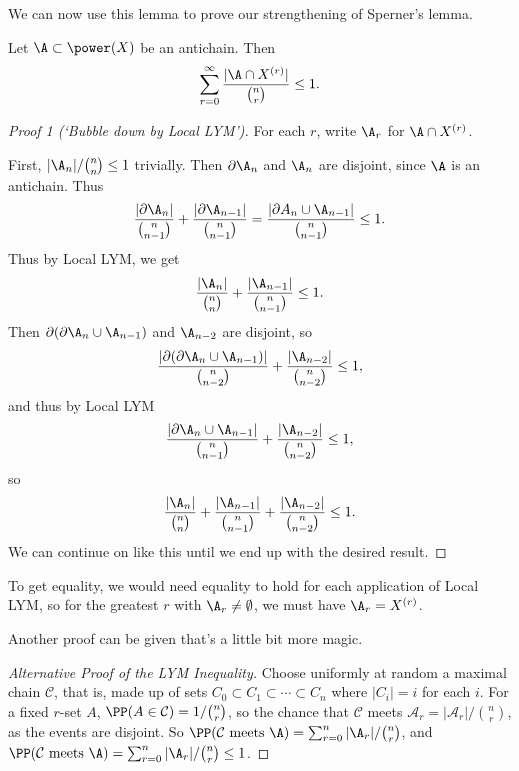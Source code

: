 We can now use this lemma to prove our strengthening of Sperner's lemma.

\begin{theorem}
    Let $\A \subset \power(X)$ be an antichain. Then
    $$
\sum_{r = 0}^{\infty} \frac{|\A \cap X^{(r)}|}{\binom{n}{r}} \leq 1.
    $$
\end{theorem}
\begin{proof}[Proof 1 (`Bubble down by Local LYM')]
    For each $r$, write $\A_r$ for $\A \cap X^{(r)}$.
    
    First, $|\A_n| / \binom{n}{n} \leq 1$ trivially. Then $\partial \A_n$ and $\A_n$ are disjoint, since $\A$ is an antichain. Thus
    $$
    \frac{|\partial \A_n|}{\binom{n}{n - 1}} + \frac{|\partial \A_{n - 1}|}{\binom{n}{n - 1}} = \frac{|\partial A_n \cup \A_{n - 1}|}{\binom{n}{n - 1}} \leq 1.
    $$
    Thus by Local LYM, we get
    $$
    \frac{|\A_n|}{\binom{n}{n}} + \frac{|\A_{n - 1}|}{\binom{n}{n - 1}} \leq 1.
    $$
    Then $\partial(\partial \A_n \cup \A_{n - 1})$ and $\A_{n - 2}$ are disjoint, so
    $$
\frac{|\partial(\partial \A_n \cup \A_{n - 1})|}{\binom{n}{n - 2}} + \frac{|\A_{n - 2}|}{\binom{n}{n - 2}} \leq 1,
    $$
    and thus by Local LYM
    $$
    \frac{|\partial \A_n \cup \A_{n - 1}|}{\binom{n}{n - 1}} + \frac{|\A_{n - 2}|}{\binom{n}{n - 2}} \leq 1,
    $$
    so
    $$
    \frac{|\A_n|}{\binom{n}{n}} + \frac{|\A_{n - 1}|}{\binom{n}{n - 1}} + \frac{|\A_{n - 2}|}{\binom{n}{n - 2}}  \leq 1.
    $$
    We can continue on like this until we end up with the desired result.
\end{proof}
To get equality, we would need equality to hold for each application of Local LYM, so for the greatest $r$ with $\A_r \neq \emptyset$, we must have $\A_r = X^{(r)}$.

Another proof can be given that's a little bit more magic.

\begin{proof}[Alternative Proof of the LYM Inequality]
    Choose uniformly at random a maximal chain $\mathcal{C}$, that is, made up of sets $C_0 \subset C_1 \subset \cdots \subset C_n$ where $|C_i| = i$ for each $i$.
    For a fixed $r$-set $A$, $\PP(A \in \mathcal{C}) = 1/\binom{n}{r}$, so the chance that $\mathcal{C}$ meets $\mathcal{A}_r = |\mathcal{A}_r|/\binom{n}{r}$, as the events are disjoint. So $\PP(\mathcal{C} \text{ meets } \A) = \sum_{r = 0}^n |\A_r|/\binom{n}{r}$, and $\PP(\mathcal{C} \text{ meets } \A) = \sum_{r = 0}^n |\A_r| / \binom{n}{r} \leq 1$.
\end{proof}

